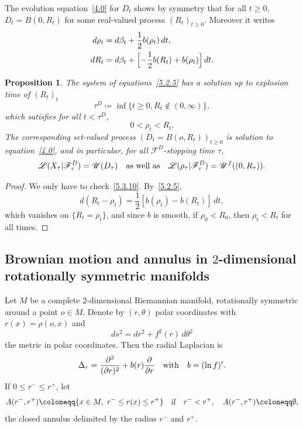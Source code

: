 \documentclass[JEP,XML,SOM,Unicode,NoFloatCountersInSection,published]{cedram}
\theoremstyle{plain}
\newtheorem{prop}[thm]{Proposition}
\theoremstyle{definition}
\newcommand{\SF}{{\mathscr F}}
\newcommand{\SL}{{\mathscr L}}
\newcommand{\SU}{{\mathscr U}}
\newcommand\df{\coloneqq}
\let\f\frac
\let\b\beta
\begin{document}
The evolution equation~\eqref{4.0} for $D_t$ shows by symmetry that for all $t\ge 0$, $D_t=B(0,R_t)$ for some real-valued process $(R_t)_{t\ge0}$. Moreover it writes
\begin{equation}
\label{5.2.5}
\begin{split}
d\rho_t&=d\b_t+\f12 b(\rho_t)\,dt,\\
dR_t&= d\beta_t+\Bigl[-\f12 b(R_t)+b(\rho_t)\Bigr]\,dt.
\end{split}
\end{equation}
\begin{prop}
\label{P5.2.1}
The system of equations~\eqref{5.2.5} has a solution up to explosion time of $(R_t)_t$
\begin{equation}
\tau^D\df \inf\{t\ge 0, R_t\not\in (0,\infty)\},
\end{equation}
which satisfies for all $t<\tau^D$,
\begin{equation}
\label{5.3.10}
0< \rho_t< R_t.
\end{equation}
The corresponding set-valued process $(D_t=B(o,R_t))_{t\ge0}$ is solution to equation~\eqref{4.0}, and in particular, for all $\SF^D$-stopping time $\tau$,
\begin{equation}
\SL(X_\tau|\SF_\tau^D)=\SU(D_\tau)\quad\hbox{as well as}\quad \SL(\rho_\tau|\SF_\tau^D)=\SU^f((0,R_\tau)).
\end{equation}
\end{prop}
\begin{proof}
We only have to check~\eqref{5.3.10}. By~\eqref{5.2.5},
\begin{equation}
d(R_t-\rho_t)=\f12\left[b(\rho_t)-b(R_t)\right]\,dt,
\end{equation}
which vanishes on $\{R_t=\rho_t\}$, and since $b$ is smooth, if $\rho_0<R_0$, then $\rho_t<R_t$ for all times.
\end{proof}
\subsection{Brownian motion and annulus in $2$-dimensional rotationally symmetric manifolds}
\label{Subsection5.3}

Let $M$ be a complete $2$-dimensional Riemannian manifold, rotationally symmetric around a point $o\in M$. Denote by $(r,\theta)$ polar coordinates with $r(x)=\rho(o,x)$ and
\begin{equation}
ds^2=dr^2+f^2(r)\,d\theta^2
\end{equation}
the metric in polar coordinates. Then the radial Laplacian is
\begin{equation}
\Delta_r=\f{\partial^2}{(\partial r)^2} +b(r)\f{\partial}{\partial r}\quad\hbox{with}\quad b=(\ln f)'.
\end{equation}
If $0\le r^-\le r^+$, let
\begin{equation}
A(r^-,r^+) \df \{x\in M,\ r^-\leq r(x)\leq r^+\}\quad\hbox{if}\quad r^-<r^+, \quad A(r^-,r^+)\df\emptyset,
\end{equation}
the closed annulus delimited by the radius $r^-$ and $r^+$.
\end{document}
